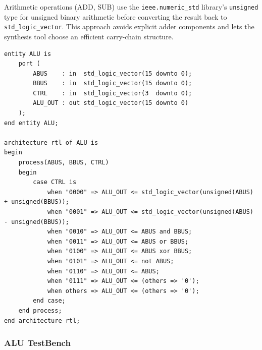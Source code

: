 \documentclass[12pt, a4paper]{report}
\begin{document}
Arithmetic operations (ADD, SUB) use the \texttt{ieee.numeric\_std} library's
\texttt{unsigned} type for unsigned binary arithmetic before converting the result
back to \texttt{std\_logic\_vector}. This approach avoids explicit adder components
and lets the synthesis tool choose an efficient carry-chain structure.


\begin{lstlisting}[caption={ALU entity and architecture (ALU.vhd).}, xleftmargin=-1cm, xrightmargin=-1cm,
                   label={lst:alu}]
entity ALU is
    port (
        ABUS    : in  std_logic_vector(15 downto 0);  
        BBUS    : in  std_logic_vector(15 downto 0);  
        CTRL    : in  std_logic_vector(3  downto 0);  
        ALU_OUT : out std_logic_vector(15 downto 0)   
    );
end entity ALU;
 
architecture rtl of ALU is
begin
    process(ABUS, BBUS, CTRL)
    begin
        case CTRL is
            when "0000" => ALU_OUT <= std_logic_vector(unsigned(ABUS) + unsigned(BBUS));
            when "0001" => ALU_OUT <= std_logic_vector(unsigned(ABUS) - unsigned(BBUS));
            when "0010" => ALU_OUT <= ABUS and BBUS;
            when "0011" => ALU_OUT <= ABUS or BBUS;
            when "0100" => ALU_OUT <= ABUS xor BBUS;
            when "0101" => ALU_OUT <= not ABUS;
            when "0110" => ALU_OUT <= ABUS;
            when "0111" => ALU_OUT <= (others => '0');
            when others => ALU_OUT <= (others => '0');
        end case;
    end process;
end architecture rtl;
\end{lstlisting}


\subsubsection{ALU TestBench}
\end{document}
